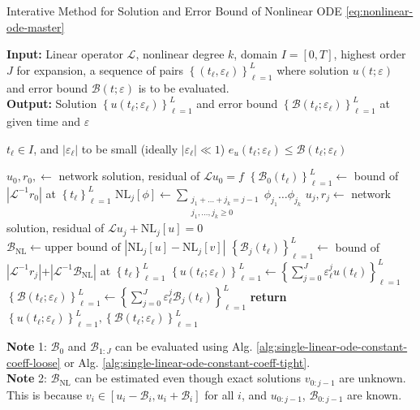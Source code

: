 \documentclass[accepted]{uai2023}
\newcommand{\Err}{e}
\newcommand{\Bound}{\mathcal{B}}
\renewcommand{\L}{\mathcal{L}}
\begin{document}
    \begin{algorithm}
        \small
        \caption{Interative Method for Solution and Error Bound of Nonlinear ODE \ref{eq:nonlinear-ode-master}} \label{alg:nonlinear-iterative}
        \textbf{Input:} Linear operator $\L$, nonlinear degree $k$, domain $I=[0, T]$, highest order $J$ for expansion, a sequence of pairs $\left\{(t_\ell, \varepsilon_\ell)\right\}_{\ell=1}^{L}$ where solution $u(t; \varepsilon)$ and error bound $\Bound(t; \varepsilon)$ is to be evaluated. \\
        \textbf{Output:} Solution $\left\{u(t_\ell; \varepsilon_\ell)\right\}_{\ell=1}^{L}$ and error bound $\left\{\Bound(t_\ell; \varepsilon_\ell)\right\}_{\ell=1}^{L}$ at given time and $\varepsilon$
        \begin{algorithmic}
            \Require $t_\ell \in I$, and $|\varepsilon_\ell|$ to be small (ideally $|\varepsilon_\ell| \ll 1$)
            \Ensure $\Err_{u}(t_\ell; \varepsilon_\ell) \leq \Bound(t_\ell; \varepsilon_\ell)$ 
            \hspace{0.5em}

            \State $u_0, r_0, \gets$ network solution, residual of $\L u_0 = f$
            \State $\left\{\Bound_{0}(t_\ell)\right\}_{\ell=1}^L \gets$ bound of $\left|\L^{-1}r_0\right|$ at $\left\{t_\ell\right\}_{\ell=1}^L$
                \State $\text{NL}_j[\phi] \gets \sum_{\substack{j_1 + \dots + j_k = j-1\\ j_1, \dots, j_k \geq 0}} \phi_{j_1} \dots \phi_{j_k}$
                \State $u_j, r_j \gets$ network solution, residual of $\L u_j + \text{NL}_j[u] = 0$
                \State $\Bound_{\text{NL}} \gets \text{upper bound of }|\text{NL}_j[u] - \text{NL}_j[v]|$
                \State $\left\{\Bound_{j}(t_\ell)\right\}_{\ell=1}^L \gets$  bound of $|\L^{-1}r_j|$+$|\L^{-1}\Bound_{\text{NL}}|$ at $\left\{t_\ell\right\}_{\ell=1}^L$
            \EndFor
            \State $\left\{u(t_\ell; \varepsilon_\ell)\right\}_{\ell=1}^L \gets \left\{\sum_{j=0}^{J}\varepsilon_\ell^j u(t_\ell)\right\}_{\ell=1}^L $ 
            \State $\left\{\Bound(t_\ell; \varepsilon_\ell)\right\}_{\ell=1}^L \gets \left\{\sum_{j=0}^{J}\varepsilon_\ell^j \Bound_j(t_\ell)\right\}_{\ell=1}^L $ 
            \State \textbf{return} $\left\{u(t_\ell; \varepsilon_\ell)\right\}_{\ell=1}^L, \left\{\Bound(t_\ell; \varepsilon_\ell)\right\}_{\ell=1}^L$
        \end{algorithmic}
        \vspace{0.5em}

        \textbf{Note} 1: $\Bound_0$ and $\Bound_{1:J}$ can be evaluated using Alg. \ref{alg:single-linear-ode-constant-coeff-loose} or Alg. \ref{alg:single-linear-ode-constant-coeff-tight}.\\
        \textbf{Note} 2: $\Bound_\text{NL}$ can be estimated even though exact solutions $v_{0:j-1}$ are unknown. This is because $v_i \in [u_i - \Bound_i, u_i+\Bound_i]$ for all $i$, and $u_{0:j-1}$, $\Bound_{0:j-1}$ are known.
    \end{algorithm}
\end{document}
